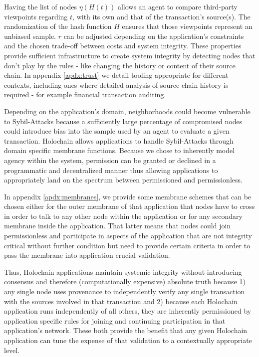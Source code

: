 \documentclass[twocolumn,showpacs,%
  nofootinbib,aps,superscriptaddress,%
  eqsecnum,prd,notitlepage,showkeys,10pt]{revtex4-1}
\begin{document}
Having the list of nodes $\eta(H(t))$ allows an agent to compare third-party viewpoints regarding $t$, with its own and that of the transaction's source(s).
The randomization of the hash function $H$ ensures that those viewpoints represent
an unbiased sample.
$r$ can be adjusted depending on the application's constraints and the chosen trade-off between costs and system integrity.
These properties provide sufficient infrastructure to create system integrity
by detecting nodes that don't play by the rules - like changing the history or
content of their source chain.
In appendix \ref{apdx:trust} we detail tooling appropriate for different contexts,
including ones where detailed analysis of source chain history is required -
for example financial transaction auditing.

Depending on the application's domain, neighborhoods could become vulnerable to Sybil-Attacks because a sufficiently large percentage of compromised nodes could introduce bias into the sample used by an agent to evaluate a given transaction.
Holochain allows applications to handle Sybil-Attacks through domain specific
membrane functions.
Because we chose to inherently model agency within the system,
permission can be granted or declined in a programmatic and decentralized manner
thus allowing applications to appropriately land on the spectrum between permissioned and permissionless.

In appendix \ref{apdx:membranes}, we provide some membrane schemes that can be
chosen either for the outer
membrane of that application that nodes have to cross in order to talk to
any other node within the application or for any secondary membrane inside
the application.
That latter means that nodes could join permissionless and participate in aspects
of the application that are not integrity critical without further condition
but need to provide certain criteria in order to pass the membrane into application crucial
validation.

Thus, Holochain applications maintain systemic integrity without introducing
consensus and therefore (computationally expensive) absolute truth because 1) any single node uses provenance to independently verify any single transaction with the sources involved in that transaction and 2) because each Holochain application runs independently of all others, they are inherently permissioned by application specific rules for joining and continuing participation in that application's network.
These both provide the benefit that any given Holochain application can tune the expense of that validation to a contextually appropriate level.
\end{document}
